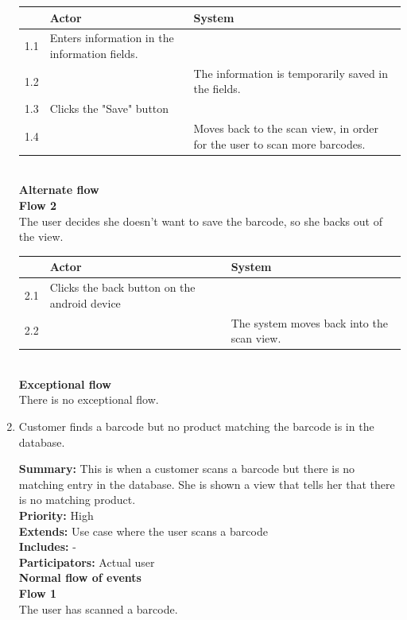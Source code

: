 \documentclass{report}
\begin{document}
\begin{enumerate}
    \begin{tabular}{ | l | p{4cm} | p{4cm} |}
    \hline
      & Actor & System \\ \hline
    1.1 & Enters information in the information fields. & \\ \hline
    1.2 & & The information is temporarily saved in the fields. \\ \hline
    1.3 & Clicks the "Save" button & \\ \hline
    1.4 & & Moves back to the scan view, in order for the user to scan more barcodes. \\
    \hline
    \end{tabular} \\

    \textbf{Alternate flow} \\
    \textbf{Flow 2} \\ The user decides she doesn't want to save the barcode, so she backs out of the view. \\

    \begin{tabular}{ | l | p{4cm} | p{4cm} |}
    \hline
      & Actor & System \\ \hline
    2.1 & Clicks the back button on the android device & \\
    2.2 & & The system moves back into the scan view. \\
    \hline
    \end{tabular} \\

    \textbf{Exceptional flow} \\ There is no exceptional flow.

  \item Customer finds a barcode but no product matching the barcode is in the database. \

    \textbf{Summary:} This is when a customer scans a barcode but there is no matching entry in the database. She is shown a view that tells her that there is no matching product. \\
    \textbf{Priority:} High \\
    \textbf{Extends:} Use case where the user scans a barcode \\
    \textbf{Includes:} - \\
    \textbf{Participators:} Actual user \\
    \textbf{Normal flow of events} \\
    \textbf{Flow 1} \\ The user has scanned a barcode. \\


\end{enumerate}
\end{document}
